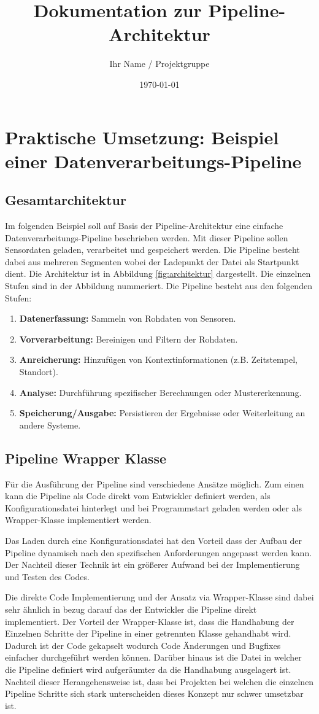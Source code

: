 \documentclass[a4paper]{article} %
\title{Dokumentation zur Pipeline-Architektur}
\author{Ihr Name / Projektgruppe}
\date{\today}
\begin{document}
\section{Praktische Umsetzung: Beispiel einer Datenverarbeitungs-Pipeline}
\subsection{Gesamtarchitektur}
Im folgenden Beispiel soll auf Basis der Pipeline-Architektur eine einfache Datenverarbeitungs-Pipeline beschrieben werden. Mit dieser Pipeline sollen Sensordaten geladen, verarbeitet und gespeichert werden. Die Pipeline besteht dabei aus mehreren Segmenten wobei der Ladepunkt der Datei als Startpunkt dient.
Die Architektur ist in Abbildung \ref{fig:architektur} dargestellt. Die einzelnen Stufen sind in der Abbildung nummeriert.
Die Pipeline besteht aus den folgenden Stufen:
\begin{enumerate}
    \item \textbf{Datenerfassung:} Sammeln von Rohdaten von Sensoren.
    \item \textbf{Vorverarbeitung:} Bereinigen und Filtern der Rohdaten.
    \item \textbf{Anreicherung:} Hinzufügen von Kontextinformationen (z.B. Zeitstempel, Standort).
    \item \textbf{Analyse:} Durchführung spezifischer Berechnungen oder Mustererkennung.
    \item \textbf{Speicherung/Ausgabe:} Persistieren der Ergebnisse oder Weiterleitung an andere Systeme.
\end{enumerate}

\subsection{Pipeline Wrapper Klasse}
Für die Ausführung der Pipeline sind verschiedene Ansätze möglich. Zum einen kann die Pipeline als Code direkt vom Entwickler definiert werden, als Konfigurationsdatei hinterlegt und bei Programmstart geladen werden oder als Wrapper-Klasse implementiert werden.

Das Laden durch eine Konfigurationsdatei hat den Vorteil dass der Aufbau der Pipeline dynamisch nach den spezifischen Anforderungen angepasst werden kann. Der Nachteil dieser Technik ist ein größerer Aufwand bei der Implementierung und Testen des Codes.

Die direkte Code Implementierung und der Ansatz via Wrapper-Klasse sind dabei sehr ähnlich in bezug darauf das der Entwickler die Pipeline direkt implementiert. Der Vorteil der Wrapper-Klasse ist, dass die Handhabung der Einzelnen Schritte der Pipeline in einer getrennten Klasse gehandhabt wird. Dadurch ist der Code gekapselt wodurch Code Änderungen und Bugfixes einfacher durchgeführt werden können. Darüber hinaus ist die Datei in welcher die Pipeline definiert wird aufgeräumter da die Handhabung ausgelagert ist. Nachteil dieser Herangehensweise ist, dass bei Projekten bei welchen die einzelnen Pipeline Schritte sich stark unterscheiden dieses Konzept nur schwer umsetzbar ist.
\end{document}
